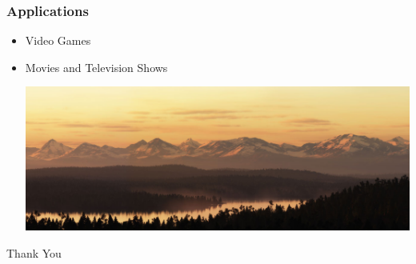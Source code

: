 \documentclass{beamer}
\begin{document}
\begin{frame}
\frametitle{Applications}
\begin{itemize}
\item Video Games
\item Movies and Television Shows
\\
\begin{center}
\includegraphics[scale = 0.2]{applicationslidepic.jpg}
\end{center}
\end{itemize}
\end{frame}


\begin{frame}
 Thank You
\end{frame}


\end{document}
